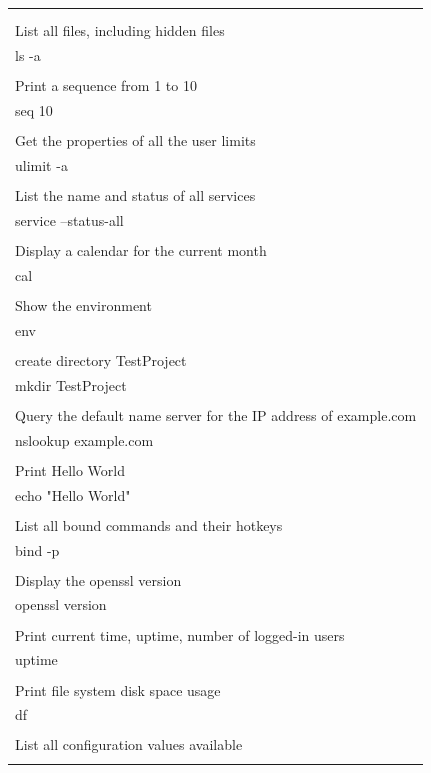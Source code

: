 \documentclass[11pt]{article}
\begin{document}
\begin{figure}[ht!]
\begin{tabular}{l}
\begin{minipage}{0.97\textwidth}
{        free\\\\
        List all files, including hidden files\\
        ls -a\\\\
        Print a sequence from 1 to 10\\
        seq 10\\\\
        Get the properties of all the user limits\\
        ulimit -a\\\\
        List the name and status of all services\\
        service --status-all\\\\
        Display a calendar for the current month\\
        cal\\\\
        Show the environment\\
        env\\\\
        create directory TestProject\\
        mkdir TestProject\\\\
        Query the default name server for the IP address of example.com\\
        nslookup example.com\\\\
        Print Hello World\\
        echo "Hello World"\\\\
        List all bound commands and their hotkeys\\
        bind -p\\\\
        Display the openssl version\\
        openssl version\\\\
        Print current time, uptime, number of logged-in users\\
        uptime\\\\
        Print file system disk space usage\\
        df\\\\
        List all configuration values available\\
}
\end{minipage}
\end{tabular}
\end{figure}
\end{document}
